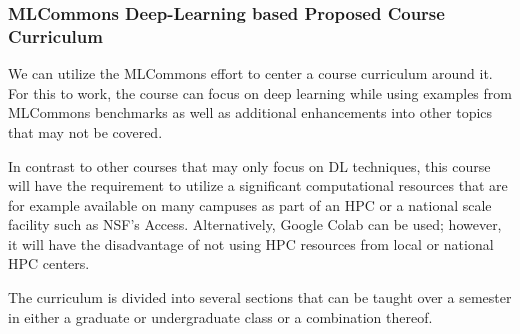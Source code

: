 \documentclass[utf8]{FrontiersinVancouver} %
\begin{document}
\subsubsection{MLCommons Deep-Learning based Proposed Course Curriculum}

We can utilize the MLCommons effort to center a course curriculum around it. For this to work, the course can focus on deep learning while using examples from MLCommons benchmarks as well as additional enhancements into other topics that may not be covered.

In contrast to other courses that may only focus on DL techniques, this course will have the requirement to utilize a significant computational resources that are for example available on many campuses as part of an HPC or a national scale facility such as NSF's Access. Alternatively, Google Colab can be used; however, it will have the disadvantage of not using HPC resources from local or national HPC centers.

The curriculum is divided into several sections that can be taught over a semester in either a graduate or undergraduate class or a combination thereof.
\end{document}
